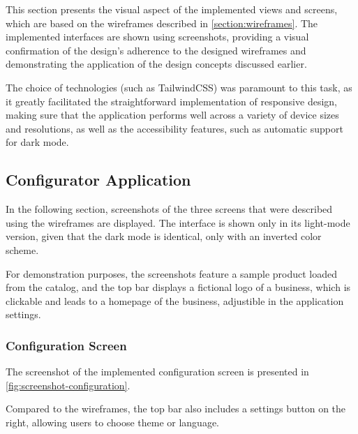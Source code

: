 
This section presents the visual aspect of the implemented views and screens, which are based on the wireframes described in \autoref{section:wireframes}. The implemented interfaces are shown using screenshots, providing a visual confirmation of the design's adherence to the designed wireframes and demonstrating the application of the design concepts discussed earlier.

The choice of technologies (such as TailwindCSS) was paramount to this task, as it greatly facilitated the straightforward implementation of responsive design, making sure that the application performs well across a variety of device sizes and resolutions, as well as the accessibility features, such as automatic support for dark mode.


\subsection{Configurator Application}

In the following section, screenshots of the three screens that were described using the wireframes are displayed. The interface is shown only in its light-mode version, given that the dark mode is identical, only with an inverted color scheme.

For demonstration purposes, the screenshots feature a sample product loaded from the catalog, and the top bar displays a fictional logo of a business, which is clickable and leads to a homepage of the business, adjustible in the application settings.  


\subsubsection{Configuration Screen}

The screenshot of the implemented configuration screen is presented in \autoref{fig:screenshot-configuration}.

Compared to the wireframes, the top bar also includes a settings button on the right, allowing users to choose theme or language.

